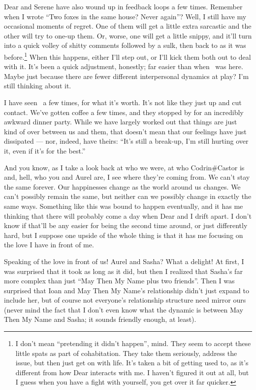 Dear and Serene have also wound up in feedback loops a few times. Remember when I wrote ``Two foxes in the same house? Never again''? Well, I still have my occasional moments of regret. One of them will get a little extra sarcastic and the other will try to one-up them. Or, worse, one will get a little snippy, and it'll turn into a quick volley of shitty comments followed by a sulk, then back to as it was before.\footnote{I don't mean ``pretending it didn't happen'', mind. They seem to accept these little spats as part of cohabitation. They take them seriously, address the issue, but then just get on with life. It's taken a bit of getting used to, as it's different from how Dear interacts with me. I haven't figured it out at all, but I guess when you have a fight with yourself, you get over it far quicker.} When this happens, either I'll step out, or I'll kick them both out to deal with it. It's been a quick adjustment, honestly; far easier than when \Partner\ was here. Maybe just because there are fewer different interpersonal dynamics at play? I'm still thinking about it.

I have seen \Partner\ a few times, for what it's worth. It's not like they just up and cut contact. We've gotten coffee a few times, and they stopped by for an incredibly awkward dinner party. While we have largely worked out that things are just kind of over between us and them, that doesn't mean that our feelings have just dissipated — nor, indeed, have theirs: ``It's still a break-up, I'm still hurting over it, even if it's for the best.''

And you know, as I take a look back at who we were, at who Codrin\#Castor is and, hell, who you and Aurel are, I see where they're coming from. We can't stay the same forever. Our happinesses change as the world around us changes. We can't possibly remain the same, but neither can we possibly change in exactly the same ways. Something like this was bound to happen eventually, and it has me thinking that there will probably come a day when Dear and I drift apart. I don't know if that'll be any easier for being the second time around, or just differently hard, but I suppose one upside of the whole thing is that it has me focusing on the love I have in front of me.

Speaking of the love in front of us! Aurel and Sasha? What a delight! At first, I was surprised that it took as long as it did, but then I realized that Sasha's far more complex than just ``May Then My Name plus two friends''. Then I was surprised that Ioan and May Then My Name's relationship didn't just expand to include her, but of course not everyone's relationship structure need mirror ours (never mind the fact that I don't even know what the dynamic is between May Then My Name and Sasha; it sounds friendly enough, at least).

